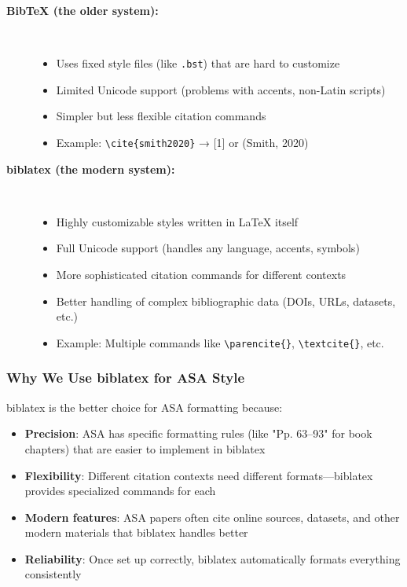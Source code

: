 \documentclass[11pt,a4paper]{ltxdoc}
\begin{document}
\begin{description}
  \item[\textbf{BibTeX (the older system):}] \hfill \\
  \begin{itemize}
    \item Uses fixed style files (like \texttt{.bst}) that are hard to customize
    \item Limited Unicode support (problems with accents, non-Latin scripts)
    \item Simpler but less flexible citation commands
    \item Example: \texttt{\textbackslash cite\{smith2020\}} → [1] or (Smith, 2020)
  \end{itemize}
  
  \item[\textbf{biblatex (the modern system):}] \hfill \\
  \begin{itemize}
    \item Highly customizable styles written in LaTeX itself
    \item Full Unicode support (handles any language, accents, symbols)
    \item More sophisticated citation commands for different contexts
    \item Better handling of complex bibliographic data (DOIs, URLs, datasets, etc.)
    \item Example: Multiple commands like \texttt{\textbackslash parencite\{\}}, \texttt{\textbackslash textcite\{\}}, etc.
  \end{itemize}
\end{description}

\subsubsection{Why We Use biblatex for ASA Style}

\textsf{biblatex} is the better choice for ASA formatting because:

\begin{itemize}
  \item \textbf{Precision}: ASA has specific formatting rules (like "Pp. 63–93" for book chapters) that are easier to implement in biblatex
  \item \textbf{Flexibility}: Different citation contexts need different formats—biblatex provides specialized commands for each
  \item \textbf{Modern features}: ASA papers often cite online sources, datasets, and other modern materials that biblatex handles better
  \item \textbf{Reliability}: Once set up correctly, biblatex automatically formats everything consistently
\end{itemize}
\end{document}
